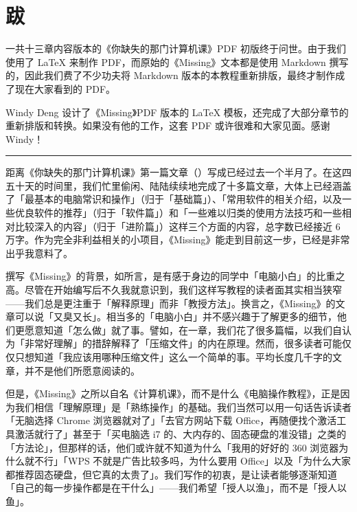 \chapter{跋}
\label{afterwords}

一共十三章内容版本的《你缺失的那门计算机课》PDF 初版终于问世。由于我们使用了 \LaTeX{} 来制作 PDF，而原始的《Missing》文本都是使用 Markdown 撰写的，因此我们费了不少功夫将 Markdown 版本的本教程重新排版，最终才制作成了现在大家看到的 PDF。

Windy Deng 设计了《Missing》PDF 版本的 \LaTeX{} 模板，还完成了大部分章节的重新排版和转换。如果没有他的工作，这套 PDF 或许很难和大家见面。感谢 Windy！


\begin{center}\rule{0.5\linewidth}{0.5pt}\end{center}

距离《你缺失的那门计算机课》第一篇文章（）写成已经过去一个半月了。在这四五十天的时间里，我们忙里偷闲、陆陆续续地完成了十多篇文章，大体上已经涵盖了「最基本的电脑常识和操作」（归于「基础篇」）、「常用软件的相关介绍，以及一些优良软件的推荐」（归于「软件篇」）和「一些难以归类的使用方法技巧和一些相对比较深入的内容」（归于「进阶篇」）这样三个方面的内容，总字数已经接近 6 万字。作为完全非利益相关的小项目，《Missing》能走到目前这一步，已经是非常出乎我意料了。

撰写《Missing》的背景，如所言，是有感于身边的同学中「电脑小白」的比重之高。尽管在开始编写后不久我就意识到，我们这样写教程的读者面其实相当狭窄——我们总是更注重于「解释原理」而非「教授方法」。换言之，《Missing》的文章可以说「又臭又长」。相当多的「电脑小白」并不感兴趣于了解更多的细节，他们更愿意知道「怎么做」就了事。譬如，在一章，我们花了很多篇幅，以我们自认为「非常好理解」的措辞解释了「压缩文件」的内在原理。然而，很多读者可能仅仅只想知道「我应该用哪种压缩文件」这么一个简单的事。平均长度几千字的文章，并不是他们所愿意阅读的。

但是，《Missing》之所以自名《计算机课》，而不是什么《电脑操作教程》，正是因为我们相信「理解原理」是「熟练操作」的基础。我们当然可以用一句话告诉读者「无脑选择 Chrome 浏览器就对了」「去官方网站下载 Office，再随便找个激活工具激活就行了」甚至于「买电脑选 i7 的、大内存的、固态硬盘的准没错」之类的「方法论」，但那样的话，他们或许就不知道为什么「我用的好好的 360 浏览器为什么就不行」「WPS 不就是广告比较多吗，为什么要用 Office」以及「为什么大家都推荐固态硬盘，但它真的太贵了」。我们写作的初衷，是让读者能够逐渐知道「自己的每一步操作都是在干什么」——我们希望「授人以渔」，而不是「授人以鱼」。

